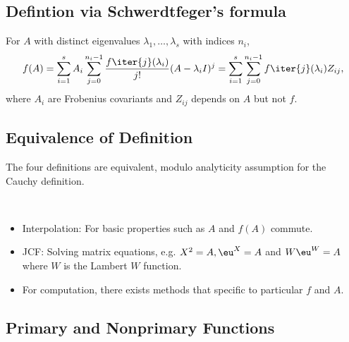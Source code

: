 \documentclass{article}
\begin{document}
\subsection{Defintion via Schwerdtfeger's formula}

\begin{definition}
    [Schwerdtfeger, 1938] For $A$ with distinct eigenvalues
    $\lambda_1,\dots,\lambda_s$ with indices $n_i$, 
    \begin{equation}\notag
        f(A) = \sum_{i=1}^s A_i \sum_{j=0}^{n_i-1}\frac{f\iter{j}(\lambda_i)}{j!}(A-\lambda_i I)^j = \sum_{i=1}^s \sum_{j=0}^{n_i - 1}f\iter{j}(\lambda_i)Z_{ij},
    \end{equation}
    where $A_i$ are Frobenius covariants and $Z_{ij}$ depends on $A$ but
    not $f$. 
\end{definition}

\subsection{Equivalence of Definition}

\begin{theorem}
    The four definitions are equivalent, modulo analyticity assumption
    for the Cauchy definition.
\end{theorem}

\begin{remark} \ 
    \begin{itemize}
        \item Interpolation: For basic properties such as $A$ and $f(A)$
        commute.
        \item JCF: Solving matrix equations, e.g. $X^2 = A, \eu^X = A$
        and $W\eu^W =A$ where $W$ is the Lambert $W$ function.
        \item For computation, there exists methods that specific to
        particular $f$ and $A$.
    \end{itemize}
\end{remark}

\subsection{Primary and Nonprimary Functions}
\end{document}
